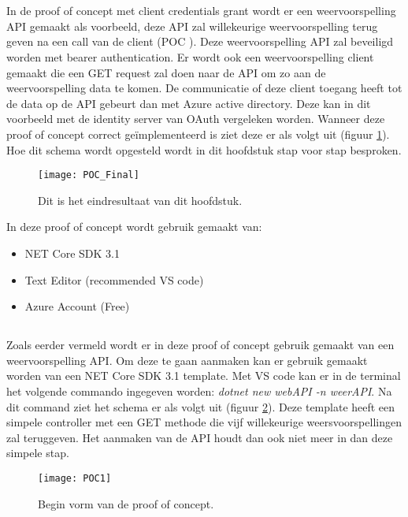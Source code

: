 \section{}
\label{sec:Client_Credentials_Grant}
In de proof of concept met client credentials grant wordt er een weervoorspelling API gemaakt als voorbeeld, deze API zal willekeurige weervoorspelling terug geven na een call van de client (POC \cite{Verlinde2020}). Deze weervoorspelling API zal beveiligd worden met bearer authentication. Er wordt ook een weervoorspelling client gemaakt die een GET request zal doen naar de API om zo aan de weervoorspelling data te komen. De communicatie of deze client toegang heeft tot de data op de API gebeurt dan met Azure active directory. Deze kan in dit voorbeeld met de identity server van OAuth vergeleken worden. Wanneer deze proof of concept correct geïmplementeerd is ziet deze er als volgt uit (figuur \ref{fig:pocfinal}). Hoe dit schema wordt opgesteld wordt in dit hoofdstuk stap voor stap besproken.\newpage
\begin{figure}[H]
	\centering
	\texttt{[image: POC\_Final]} 
	\caption[Dit is het eindresultaat van dit hoofdstuk]{Dit is het eindresultaat van dit hoofdstuk.}
	\label{fig:pocfinal}
\end{figure}
In deze proof of concept wordt gebruik gemaakt van:	
\begin{itemize}
	\item NET Core SDK 3.1
	\item Text Editor (recommended VS code)
	\item Azure Account (Free)
\end{itemize}
\subsection{}
Zoals eerder vermeld wordt er in deze proof of concept gebruik gemaakt van een weervoorspelling API. Om deze te gaan aanmaken kan er gebruik gemaakt worden van een NET Core SDK 3.1 template. Met VS code kan er in de terminal het volgende commando ingegeven worden: \emph{dotnet new webAPI -n weerAPI}.\newline
Na dit command ziet het schema er als volgt uit (figuur \ref{fig:poc1}). Deze template heeft een simpele controller met een GET methode die vijf willekeurige weersvoorspellingen zal teruggeven. Het aanmaken van de API houdt dan ook niet meer in dan deze simpele stap.
\begin{figure}[H]
	\centering
	\texttt{[image: POC1]} 
	\caption[BeginPOC]{Begin vorm van de proof of concept.}
	\label{fig:poc1}
\end{figure}
